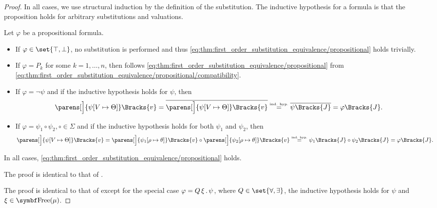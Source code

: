 \begin{proof}
  In all cases, we use structural induction by the definition of the substitution\IND. The inductive hypothesis for a formula is that the proposition holds for arbitrary substitutions and valuations.

   Let \( \varphi \) be a propositional formula.
  \begin{itemize}
    \item If \( \varphi \in \set{ \top, \bot } \), no substitution is performed and thus \eqref{eq:thm:first_order_substitution_equivalence/propositional} holds trivially.

    \item If \( \varphi = P_k \) for some \( k = 1, \ldots, n \), then follows \eqref{eq:thm:first_order_substitution_equivalence/propositional} from \eqref{eq:thm:first_order_substitution_equivalence/propositional/compatibility}.

    \item If \( \varphi = \neg \psi \) and if the inductive hypothesis holds for \( \psi \), then
    \begin{equation*}
      \parens[\Big]{ \psi[V \mapsto \Theta] }\Bracks{v}
      =
      \overline{\parens[\Big]{ \psi[V \mapsto \Theta] }\Bracks{v}}
      \overset {\IndHyp} =
      \overline{\psi \Bracks{J}}
      =
      \varphi \Bracks{J}.
    \end{equation*}

    \item If \( \varphi = \psi_1 \circ \psi_2, \circ \in \Sigma \) and if the inductive hypothesis holds for both \( \psi_1 \) and \( \psi_2 \), then
    \begin{equation*}
      \parens[\Big]{ \psi[V \mapsto \Theta] }\Bracks{v}
      =
      \parens[\Big]{ \psi_1[\rho \mapsto \theta] }\Bracks{v} \circ \parens[\Big]{ \psi_2[\rho \mapsto \theta] }\Bracks{v}
      \overset {\IndHyp} =
      \psi_1 \Bracks{J} \circ \psi_2\Bracks{J}
      =
      \varphi\Bracks{J}.
    \end{equation*}
  \end{itemize}

  In all cases, \eqref{eq:thm:first_order_substitution_equivalence/propositional} holds.

   The proof is identical to that of .

   The proof is identical to that of  except for the special case \( \varphi = Q \, \xi \, . \, \psi \), where \( Q \in \set{ \forall, \exists } \), the inductive hypothesis holds for \( \psi \) and \( \xi \in \bfop{Free}(\mu) \).


\end{proof}

